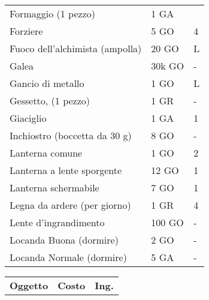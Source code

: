 \documentclass[12pt,a4paper,twoside,openany]{book}
\begin{document}
\begin{multicols}{2}
{\begin{tabularx}{0.42\textwidth}{lll}
Formaggio (1 pezzo)& 1 GA& \\
Forziere & 5 GO&4\\
Fuoco dell'alchimista (ampolla)& 20 GO& L\\
Galea & 30k GO  & -\\
Gancio di metallo & 1 GO& L\\
Gessetto, (1 pezzo) & 1 GR& -  \\
Giaciglio& 1 GA& 1 \\
Inchiostro (boccetta da 30 g)& 8 GO& - \\
Lanterna comune& 1 GO& 2 \\
Lanterna a lente sporgente  & 12 GO  & 1 \\
Lanterna schermabile& 7 GO& 1 \\
Legna da ardere (per giorno)& 1 GR& 4 \\
Lente d'ingrandimento & 100 GO & -\\
Locanda Buona (dormire) & 2 GO& -\\
Locanda Normale (dormire)& 5 GA& -\\
\end{tabularx}

\begin{tabularx}{0.42\textwidth}{lll}
\textbf{Oggetto}    & \textbf{Costo} & \textbf{Ing.}\\


\end{tabularx}}
\end{multicols}
\end{document}
